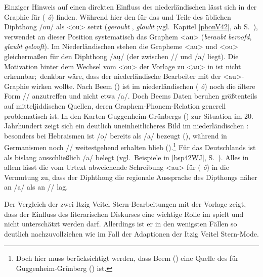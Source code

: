  
Einziger Hinweis auf einen direkten Einfluss des niederländischen \hai{{\NWJ}} lässt sich in der Graphie für  ({\mhd} \textit{ô}) finden. Während  hier den für das \hai{{\SWJ}} und Teile des \hai{{\ZWJ}} üblichen Diphthong /ou/ als <ou> setzt (\textit{geroubt} , \textit{gloubt} ;vgl.\, Kapitel \ref{phonV42}, ab S.\, \pageref{phonV42}), verwendet  an dieser Position systematisch das Graphem <au> (\textit{beraubt} {\ndl} \textit{beroofd}, \textit{glaubt} {\ndl} \textit{gelooft}). Im Niederländischen stehen die Grapheme <au> und <ou> gleichermaßen für den Diphthong /ʌu̯/ (der zwischen /\textopeno {}/ und /a/ liegt). Die Motivation hinter dem Wechsel vom <ou> der Vorlage zu <au> in  ist nicht erkennbar;\, denkbar wäre, dass der niederländische Bearbeiter mit der <au>-Graphie  wirken wollte. Nach Beem (\citeyear[127]{Beem1954}) ist im niederländischen \hai{{\NWJ}}  ({\mhd} \textit{ô}) noch die ältere Form /\textopeno {}/ anzutreffen und nicht etwa /a/. Doch Beems Daten beruhen größtenteils auf mitteljiddischen Quellen, deren Graphem-Phonem-Relation generell problematisch ist. In den Karten Guggenheim-Grünbergs (\citeyear{GuggenheimGruenberg1973}) zur Situation im 20. Jahrhundert zeigt sich ein deutlich uneinheitlicheres Bild im niederländischen : besonders bei Hebraismen ist /o\textlengthmark/ bereits als /a/ bezeugt (\citealt[Karten 13 u. 20]{GuggenheimGruenberg1973}), während in Germanismen noch /\textopeno {}/ weitestgehend erhalten blieb (\citealt[Karte 16]{GuggenheimGruenberg1973}).\footnote{Doch hier muss berücksichtigt werden, dass Beem (\citeyear[127]{Beem1954}) eine Quelle des {\ndl} \hai{{\NWJ}} für Guggenheim-Grünberg (\citeyear{GuggenheimGruenberg1973}) ist.} Für das \hai{{\NWJ}} Deutschlands ist  als bislang ausschließlich /a/ belegt (vgl.\, Beispiele in \ref{bsp42WJ}, S.\, \pageref{bsp42WJ}). Alles in allem lässt die vom Urtext abweichende Schreibung <au> für  ({\mhd} \textit{ô}) in  die Vermutung zu, dass der Diphthong die regionale Aussprache des Dipthongs näher an /a/ als an /\textopeno {}/ lag.

Der Vergleich der zwei Itzig Veitel Stern-Bearbeitungen mit der Vorlage zeigt, dass der Einfluss des literarischen Diskurses eine wichtige Rolle im \hai{{\LiJi}} spielt und nicht unterschätzt werden darf. Allerdings ist er in den wenigsten Fällen so deutlich nachzuvollziehen wie im Fall der Adaptionen der Itzig Veitel Stern-Mode. 


